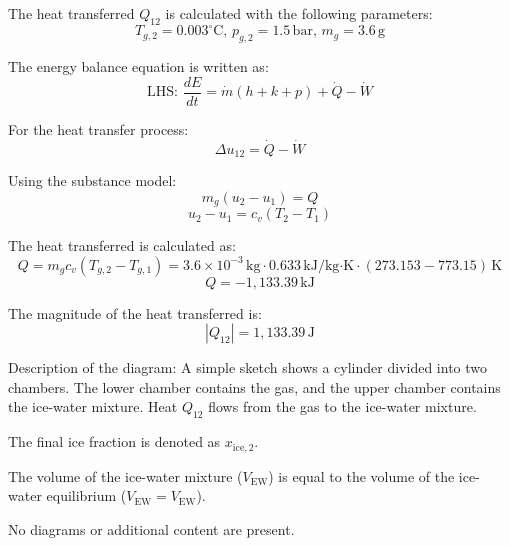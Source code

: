 The heat transferred \( Q_{12} \) is calculated with the following parameters:  
\[
T_{g,2} = 0.003^\circ\text{C}, \, p_{g,2} = 1.5 \, \text{bar}, \, m_g = 3.6 \, \text{g}
\]  

The energy balance equation is written as:  
\[
\text{LHS: } \frac{dE}{dt} = \dot{m} (h + k + p) + \dot{Q} - \dot{W}
\]  

For the heat transfer process:  
\[
\Delta u_{12} = \dot{Q} - \dot{W}
\]  

Using the substance model:  
\[
m_g (u_2 - u_1) = Q
\]  
\[
u_2 - u_1 = c_v (T_2 - T_1)
\]  

The heat transferred is calculated as:  
\[
Q = m_g c_v (T_{g,2} - T_{g,1}) = 3.6 \times 10^{-3} \, \text{kg} \cdot 0.633 \, \text{kJ/kg·K} \cdot (273.153 - 773.15) \, \text{K}
\]  
\[
Q = -1,133.39 \, \text{kJ}
\]  

The magnitude of the heat transferred is:  
\[
|Q_{12}| = 1,133.39 \, \text{J}
\]  

Description of the diagram:  
A simple sketch shows a cylinder divided into two chambers. The lower chamber contains the gas, and the upper chamber contains the ice-water mixture. Heat \( Q_{12} \) flows from the gas to the ice-water mixture.

The final ice fraction is denoted as \( x_{\text{ice},2} \).  

The volume of the ice-water mixture (\( V_{\text{EW}} \)) is equal to the volume of the ice-water equilibrium (\( V_{\text{EW}} = V_{\text{EW}} \)).  

No diagrams or additional content are present.